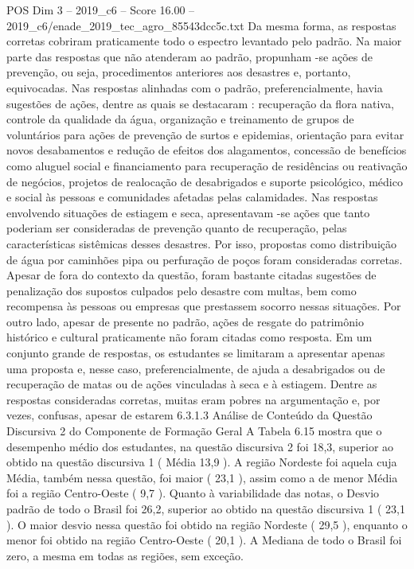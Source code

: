 \begin{textsample}{POS Dim 3 – 2019\_c6 – Score 16.00 – 2019\_c6/enade\_2019\_tec\_agro\_85543dcc5c.txt}
Da mesma forma, as respostas corretas cobriram praticamente todo o espectro levantado pelo padrão.
Na maior parte das respostas que não atenderam ao padrão, propunham -se ações de prevenção, ou seja, procedimentos anteriores aos desastres e, portanto, equivocadas.
Nas respostas alinhadas com o padrão, preferencialmente, havia sugestões de ações, dentre as quais se destacaram : recuperação da flora nativa, controle da qualidade da água, organização e treinamento de grupos de voluntários para ações de prevenção de surtos e epidemias, orientação para evitar novos desabamentos e redução de efeitos dos alagamentos, concessão de benefícios como aluguel social e financiamento para recuperação de residências ou reativação de negócios, projetos de realocação de desabrigados e suporte psicológico, médico e social às pessoas e comunidades afetadas pelas calamidades.
Nas respostas envolvendo situações de estiagem e seca, apresentavam -se ações que tanto poderiam ser consideradas de prevenção quanto de recuperação, pelas características sistêmicas desses desastres.
Por isso, propostas como distribuição de água por caminhões pipa ou perfuração de poços foram consideradas corretas.
Apesar de fora do contexto da questão, foram bastante citadas sugestões de penalização dos supostos culpados pelo desastre com multas, bem como recompensa às pessoas ou empresas que prestassem socorro nessas situações.
Por outro lado, apesar de presente no padrão, ações de resgate do patrimônio histórico e cultural praticamente não foram citadas como resposta.
Em um conjunto grande de respostas, os estudantes se limitaram a apresentar apenas uma proposta e, nesse caso, preferencialmente, de ajuda a desabrigados ou de recuperação de matas ou de ações vinculadas à seca e à estiagem.
Dentre as respostas consideradas corretas, muitas eram pobres na argumentação e, por vezes, confusas, apesar de estarem 6.3.1.3 Análise de Conteúdo da Questão Discursiva 2 do Componente de Formação Geral A Tabela 6.15 mostra que o desempenho médio dos estudantes, na questão discursiva 2 foi 18,3, superior ao obtido na questão discursiva 1 ( Média 13,9 ).
A região Nordeste foi aquela cuja Média, também nessa questão, foi maior ( 23,1 ), assim como a de menor Média foi a região Centro-Oeste ( 9,7 ).
Quanto à variabilidade das notas, o Desvio padrão de todo o Brasil foi 26,2, superior ao obtido na questão discursiva 1 ( 23,1 ).
O maior desvio nessa questão foi obtido na região Nordeste ( 29,5 ), enquanto o menor foi obtido na região Centro-Oeste ( 20,1 ).
A Mediana de todo o Brasil foi zero, a mesma em todas as regiões, sem exceção.

\end{textsample}
